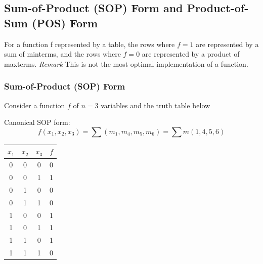 \documentclass[12pt,openany]{book}
\begin{document}
			      	
			      	
			      	\newpage
			      	\subsection{Sum-of-Product (SOP) Form and Product-of-Sum (POS) Form}
			      	For a function f represented by a table, the rows where $f=1$ are represented by a sum of minterms, and the rows where $f=0$ are represented by a product of maxterms. \newline
			      	\textit{Remark} This is not the most optimal implementation of a function. \newline
			      	
			      	\subsubsection{Sum-of-Product (SOP) Form}
			      	\vspace*{10px}
			      	Consider a function \( f \) of \( n = 3 \) variables and the truth table below
			      	
			      	Canonical SOP form:
			      	\[
			      		f(x_1, x_2, x_3) = \sum (m_1, m_4, m_5, m_6) = \sum m(1, 4, 5, 6)
			      	\]
			      	
			      	\begin{center}
			      		\begin{tabular}{|c|c|c|c|}
			      			\hline
			      			\( x_1 \) & \( x_2 \) & \( x_3 \) & \( f \) \\
			      			\hline
			      			0         & 0         & 0         & 0       \\
			      			\hline
			      			\rowcolor{blue!25}
			      			0         & 0         & 1         & 1       \\
			      			\hline
			      			0         & 1         & 0         & 0       \\
			      			\hline
			      			0         & 1         & 1         & 0       \\
			      			\hline
			      			\rowcolor{blue!25}
			      			1         & 0         & 0         & 1       \\
			      			\hline
			      			\rowcolor{blue!25}
			      			1         & 0         & 1         & 1       \\
			      			\hline
			      			\rowcolor{blue!25}
			      			1         & 1         & 0         & 1       \\
			      			\hline
			      			1         & 1         & 1         & 0       \\
			      			\hline
			      		\end{tabular}
			      	\end{center}
			      	
\end{document}
